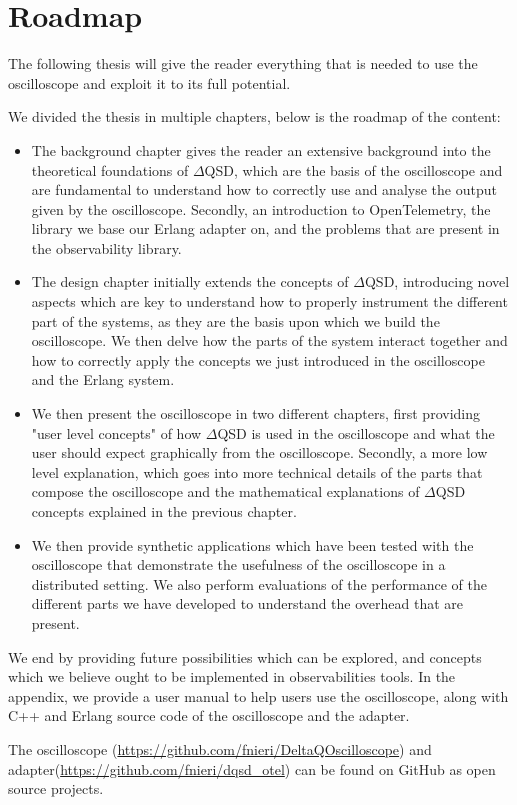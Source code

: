 \section{Roadmap}
    The following thesis will give the reader everything that is needed to use the oscilloscope and exploit it to its full potential.

    We divided the thesis in multiple chapters, below is the roadmap of the content:
    \begin{itemize}
        \item The background chapter gives the reader an extensive background into the theoretical foundations of $\Delta$QSD, which are the basis of the oscilloscope and are fundamental to understand how to correctly use and analyse the output given by the oscilloscope. Secondly, an introduction to OpenTelemetry, the library we base our Erlang adapter on, and the problems that are present in the observability library.
        \item The design chapter initially extends the concepts of $\Delta$QSD, introducing novel aspects which are key to understand how to properly instrument the different part of the systems, as they are the basis upon which we build the oscilloscope. We then delve how the parts of the system interact together and how to correctly apply the concepts we just introduced in the oscilloscope and the Erlang system.
        \item We then present the oscilloscope in two different chapters, first providing "user level concepts" of how $\Delta$QSD is used in the oscilloscope and what the user should expect graphically from the oscilloscope.
            Secondly, a more low level explanation, which goes into more technical details of the parts that compose the oscilloscope and the mathematical explanations of $\Delta$QSD concepts explained in the previous chapter.
        \item We then provide synthetic applications which have been tested with the oscilloscope that demonstrate the usefulness of the oscilloscope in a distributed setting. We also perform evaluations of the performance of the different parts we have developed to understand the overhead that are present.
    \end{itemize}

    We end by providing future possibilities which can be explored, and concepts which we believe ought to be implemented in observabilities tools. 
    In the appendix, we provide a user manual to help users use the oscilloscope, along with C++ and Erlang source code of the oscilloscope and the adapter.

    The oscilloscope (\url{https://github.com/fnieri/DeltaQOscilloscope}) and adapter(\url{https://github.com/fnieri/dqsd_otel}) can be found on GitHub as open source projects.
